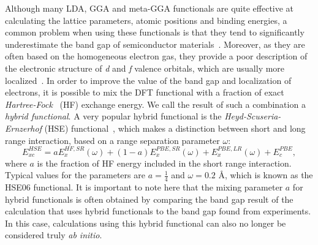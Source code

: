\begin{refsection}
 \label{dft:sec-hybrid} 
Although many LDA, GGA and meta-GGA functionals are quite effective at 
calculating the lattice parameters, atomic positions and binding energies, a 
common problem when using these functionals is that they tend to significantly 
underestimate the band gap of semiconductor materials~\cite{Tran2007}. 
Moreover, as they are often based on the homogeneous electron gas, they 
provide a poor description of the electronic structure of \textit{d} and 
\textit{f} valence orbitals, which are usually more localized~\cite{Bengone2000}. 
In order to improve the value of the band gap and localization of 
electrons, it is possible to mix the DFT functional with a fraction of exact 
\textit{Hartree-Fock}~\cite{Slater1951} (HF) exchange energy. We call the 
result of such a combination a \textit{hybrid functional}. A very popular 
hybrid functional is the \textit{Heyd-Scuseria-Ernzerhof} (HSE) 
functional~\cite{Heyd2003}, which makes a distinction between short and long 
range interaction, based on a range separation parameter $\omega$: 
\begin{equation} 
E_{xc}^{HSE} = a E_{x}^{HF,SR}(\omega) + (1-a) E_{x}^{PBE,SR}(\omega) + 
E_{x}^{PBE,LR}(\omega) + E_{c}^{PBE}, 
\end{equation} 
where $a$ is the fraction of HF energy included in the short range 
interaction. Typical values for the parameters are $a = \frac{1}{4}$ and 
$\omega = 0.2$ \AA, which is known as the HSE06 functional. It is important to 
note here that the mixing parameter $a$ for hybrid functionals is often 
obtained by comparing the band gap result of the calculation that uses hybrid 
functionals to the band gap found from experiments. In this case, calculations 
using this hybrid functional can also no longer be considered truly \textit{ab 
initio}. 
 

\end{refsection}
